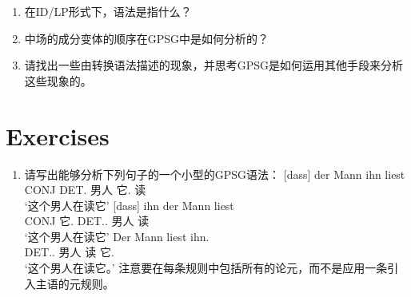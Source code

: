 \begin{enumerate}
\item 在ID/LP形式下，语法是指什么？
\item 中场的成分变体的顺序在GPSG中是如何分析的？
\item 请找出一些由转换语法描述的现象，并思考GPSG是如何运用其他手段来分析这些现象的。
\end{enumerate}

\section*{Exercises}

\begin{enumerate}
\item 请写出能够分析下列句子的一个小型的GPSG语法：
\eal
\ex 
\gll {}[dass] der Mann ihn liest\\
	 {}\spacebr{}CONJ DET.\nom{} 男人 它.\acc{} 读\\
\glt `这个男人在读它'
\ex 
\gll {}[dass] ihn der Mann liest\\
	{}\spacebr{}CONJ 它.\acc{} DET..\nom{} 男人 读\\
\glt `这个男人在读它'
\ex 
\gll Der Mann liest ihn.\\
     DET..\nom{} 男人 读 它.\acc\\
\glt `这个男人在读它。'
\zl
注意要在每条规则中包括所有的论元，而不是应用一条引入主语的元规则。
\end{enumerate}

